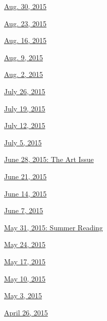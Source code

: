 \href{http://www.nytimes3xbfgragh.onion/indexes/2015/08/30/books/review/index.html}{Aug.
30, 2015}

\href{http://www.nytimes3xbfgragh.onion/indexes/2015/08/23/books/review/index.html}{Aug.
23, 2015}

\href{http://www.nytimes3xbfgragh.onion/indexes/2015/08/16/books/review/index.html}{Aug.
16, 2015}

\href{http://www.nytimes3xbfgragh.onion/indexes/2015/08/09/books/review/index.html}{Aug.
9, 2015}

\href{http://www.nytimes3xbfgragh.onion/indexes/2015/08/02/books/review/index.html}{Aug.
2, 2015}

\href{http://www.nytimes3xbfgragh.onion/indexes/2015/07/26/books/review/index.html}{July
26, 2015}

\href{http://www.nytimes3xbfgragh.onion/indexes/2015/07/19/books/review/index.html}{July
19, 2015}

\href{http://www.nytimes3xbfgragh.onion/indexes/2015/07/12/books/review/index.html}{July
12, 2015}

\href{http://www.nytimes3xbfgragh.onion/indexes/2015/07/05/books/review/index.html}{July
5, 2015}

\href{http://www.nytimes3xbfgragh.onion/interactive/2015/06/25/books/review/art-issue.html}{June
28, 2015: The Art Issue}

\href{http://www.nytimes3xbfgragh.onion/indexes/2015/06/21/books/review/index.html}{June
21, 2015}

\href{http://www.nytimes3xbfgragh.onion/indexes/2015/06/14/books/review/index.html}{June
14, 2015}

\href{http://www.nytimes3xbfgragh.onion/indexes/2015/06/07/books/review/index.html}{June
7, 2015}

\href{http://www.nytimes3xbfgragh.onion/indexes/2015/05/31/books/review/index.html}{May
31, 2015: Summer Reading}

\href{http://www.nytimes3xbfgragh.onion/indexes/2015/05/24/books/review/index.html}{May
24, 2015}

\href{http://www.nytimes3xbfgragh.onion/indexes/2015/05/17/books/review/index.html}{May
17, 2015}

\href{http://www.nytimes3xbfgragh.onion/indexes/2015/05/10/books/review/index.html}{May
10, 2015}

\href{http://www.nytimes3xbfgragh.onion/indexes/2015/05/03/books/review/index.html}{May
3, 2015}

\href{http://www.nytimes3xbfgragh.onion/indexes/2015/04/26/books/review/index.html}{April
26, 2015}

